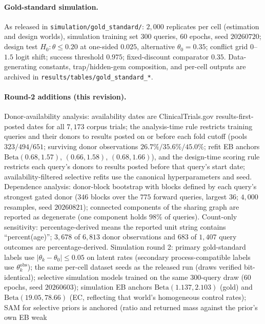 \documentclass[11pt]{article}
\begin{document}
\paragraph{Gold-standard simulation.} As released in
\texttt{simulation/gold\_standard/}: $2{,}000$ replicates per cell (estimation
and design worlds), simulation training set $300$ queries, $60$ epochs, seed
$20260720$; design test $H_0: \theta \le 0.20$ at one-sided $0.025$,
alternative $\theta_0 = 0.35$; conflict grid $0$--$1.5$ logit shift; success
threshold $0.975$; fixed-discount comparator $0.35$. Data-generating
constants, trap/hidden-gem composition, and per-cell outputs are archived in
\texttt{results/tables/\allowbreak gold\_standard\_*}.

\paragraph{Round-2 additions (this revision).} Donor-availability analysis:
availability dates are ClinicalTrials.gov results-first-posted dates for all
$7{,}173$ corpus trials; the analysis-time rule restricts training queries and
their donors to results posted on or before each fold cutoff (pools
$323/494/651$; surviving donor observations $26.7\%/35.6\%/45.0\%$; refit EB
anchors $\mathrm{Beta}(0.68,1.57)$, $(0.66,1.58)$, $(0.68,1.66)$), and the
design-time scoring rule restricts each query's donors to results posted
before that query's start date; availability-filtered selective refits use
the canonical hyperparameters and seed. Dependence analysis: donor-block
bootstrap with blocks defined by each query's strongest gated donor ($346$
blocks over the $775$ forward queries, largest $36$; $4{,}000$ resamples,
seed $20260821$); connected components of the sharing graph are reported as
degenerate (one component holds $98\%$ of queries). Count-only sensitivity:
percentage-derived means the reported unit string contains
``percent(age)''; $3{,}678$ of $6{,}813$ donor observations and $683$ of
$1{,}407$ query outcomes are percentage-derived. Simulation round 2: primary
gold-standard labels use $|\theta_k - \theta_0| \le 0.05$ on latent rates
(secondary process-compatible labels use $\theta^{\mathrm{obs}}_k$); the
same per-cell dataset seeds as the released run (draws verified
bit-identical); selective simulation models trained on the same
$300$-query draw ($60$ epochs, seed $20260603$); simulation EB anchors
$\mathrm{Beta}(1.137, 2.103)$ (gold) and $\mathrm{Beta}(19.05, 78.66)$ (EC,
reflecting that world's homogeneous control rates); SAM for selective priors
is anchored (ratio and returned mass against the prior's own EB weak
\end{document}
